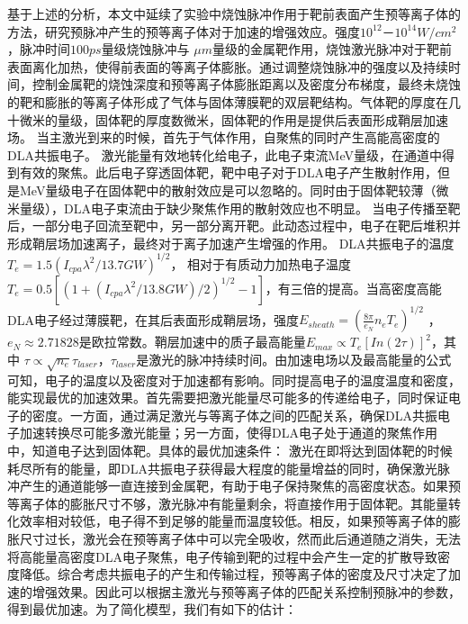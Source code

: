 基于上述的分析，本文中延续了实验中烧蚀脉冲作用于靶前表面产生预等离子体的方法，研究预脉冲产生的预等离子体对于加速的增强效应。强度$10^{12}\text{－}10^{14} W/cm^2$，脉冲时间$100ps$量级烧蚀脉冲与
$\mu m$量级的金属靶作用，烧蚀激光脉冲对于靶前表面离化加热，使得前表面的等离子体膨胀。通过调整烧蚀脉冲的强度以及持续时间，控制金属靶的烧蚀深度和预等离子体膨胀距离以及密度分布梯度，最终未烧蚀的靶和膨胀的等离子体形成了气体与固体薄膜靶的双层靶结构。气体靶的厚度在几十微米的量级，固体靶的厚度数微米，固体靶的作用是提供后表面形成鞘层加速场。 当主激光到来的时候，首先于气体作用，自聚焦的同时产生高能高密度的DLA共振电子。
激光能量有效地转化给电子，此电子束流MeV量级，在通道中得到有效的聚焦。此后电子穿透固体靶，靶中电子对于DLA电子产生散射作用，但是MeV量级电子在固体靶中的散射效应是可以忽略的。同时由于固体靶较薄（微米量级），DLA电子束流由于缺少聚焦作用的散射效应也不明显。 当电子传播至靶后，一部分电子回流至靶中，另一部分离开靶。此动态过程中，电子在靶后堆积并形成鞘层场加速离子，最终对于离子加速产生增强的作用。
DLA共振电子的温度$T_e=1.5(I_{cpa}{\lambda}^2/{13.7}GW)^{1/2}$\cite{pukhov1999particle}，
相对于有质动力加热电子温度$T_e=0.5[(1+(I_{cpa}{\lambda}^2/{13.8}GW)/2)^{1/2}-1]$\cite{wilks1992absorption}，有三倍的提高。当高密度高能DLA电子经过薄膜靶，在其后表面形成鞘层场，强度$E_{sheath}= (\frac{8 \pi}{e_N} n_e T_e)^{1/2}$ \cite{mora2003plasma}， $e_N \approx 2.71828$是欧拉常数。鞘层加速中的质子最高能量$E_{max} \propto T_e[In(2\tau)]^2$，其中 $\tau \propto \sqrt{n_e} \tau_{laser}$，$\tau_{laser}$是激光的脉冲持续时间。由加速电场以及最高能量的公式可知，电子的温度以及密度对于加速都有影响。同时提高电子的温度温度和密度，能实现最优的加速效果。首先需要把激光能量尽可能多的传递给电子，同时保证电子的密度。一方面，通过满足激光与等离子体之间的匹配关系，确保DLA共振电子加速转换尽可能多激光能量；另一方面，使得DLA电子处于通道的聚焦作用中，知道电子达到固体靶。具体的最优加速条件：
激光在即将达到固体靶的时候耗尽所有的能量，即DLA共振电子获得最大程度的能量增益的同时，确保激光脉冲产生的通道能够一直连接到金属靶，有助于电子保持聚焦的高密度状态。如果预等离子体的膨胀尺寸不够，激光脉冲有能量剩余，将直接作用于固体靶。其能量转化效率相对较低，电子得不到足够的能量而温度较低。相反，如果预等离子体的膨胀尺寸过长，激光会在预等离子体中可以完全吸收，然而此后通道随之消失，无法将高能量高密度DLA电子聚焦，电子传输到靶的过程中会产生一定的扩散导致密度降低。综合考虑共振电子的产生和传输过程，预等离子体的密度及尺寸决定了加速的增强效果。因此可以根据主激光与预等离子体的匹配关系控制预脉冲的参数，得到最优加速。为了简化模型，我们有如下的估计：


